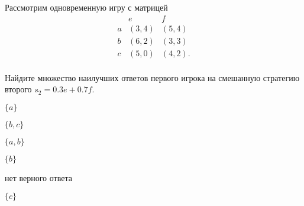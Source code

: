 
\begin{question}
Рассмотрим одновременную игру с матрицей \[
\begin{matrix}
   & e & f \\
a  & (3, 4) & (5, 4) \\
b  & (6, 2) & (3, 3) \\ 
c  & (5, 0) & (4, 2). \\ 
\end{matrix}
\]

Найдите множество наилучших ответов первого игрока на смешанную
стратегию второго \(s_2 = 0.3e + 0.7f\).
\begin{answerlist}
  \item \(\{a\}\)
  \item \(\{b, c\}\)
  \item \(\{a, b\}\)
  \item \(\{b\}\)
  \item нет верного ответа
  \item \(\{c\}\)
\end{answerlist}
\end{question}


